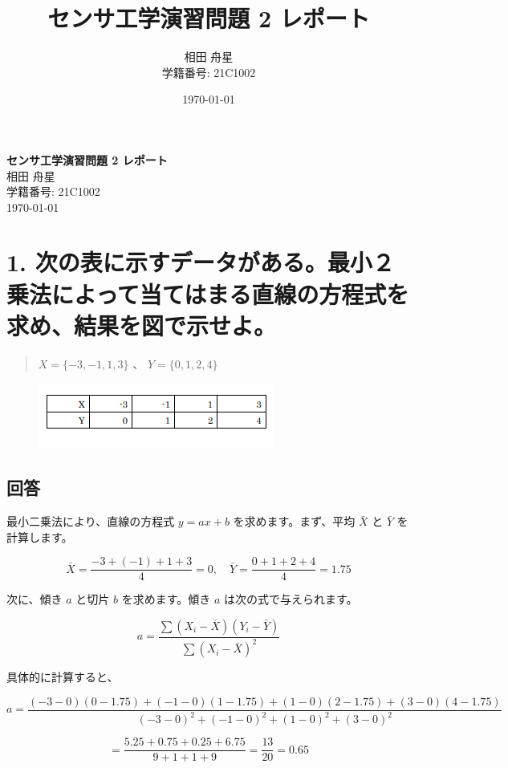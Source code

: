 \documentclass{article}
\title{センサ工学演習問題 2 レポート}
\author{相田 舟星\\学籍番号: 21C1002}
\date{\today}
\begin{document}
\begin{titlepage}
    \centering
    \vspace*{\fill}
    {\huge \textbf{センサ工学演習問題 2 レポート}}\\[1.5cm]
    {\Large 相田 舟星}\\
    {\Large 学籍番号: 21C1002}\\[2cm]
    {\large \today}
    \vspace*{\fill}
\end{titlepage}

\newpage

\section*{1. 次の表に示すデータがある。最小２乗法によって当てはまる直線の方程式を求め、結果を図で示せよ。}
\begin{quote}
    \(X = \{-3, -1, 1, 3\}\) 、 \(Y = \{0, 1, 2, 4\}\)
\end{quote}
\begin{figure}[H]
    \centering
    \includegraphics[width=0.7\linewidth]{1.png}
\end{figure}

\subsection*{回答}
最小二乗法により、直線の方程式 \(y = ax + b\) を求めます。まず、平均 \(\bar{X}\) と \(\bar{Y}\) を計算します。

\[
\bar{X} = \frac{-3 + (-1) + 1 + 3}{4} = 0, \quad \bar{Y} = \frac{0 + 1 + 2 + 4}{4} = 1.75
\]

次に、傾き \(a\) と切片 \(b\) を求めます。傾き \(a\) は次の式で与えられます。

\[
a = \frac{\sum (X_i - \bar{X})(Y_i - \bar{Y})}{\sum (X_i - \bar{X})^2}
\]

具体的に計算すると、

\[
a = \frac{(-3 - 0)(0 - 1.75) + (-1 - 0)(1 - 1.75) + (1 - 0)(2 - 1.75) + (3 - 0)(4 - 1.75)}{(-3 - 0)^2 + (-1 - 0)^2 + (1 - 0)^2 + (3 - 0)^2}
\]

\[
= \frac{5.25 + 0.75 + 0.25 + 6.75}{9 + 1 + 1 + 9} = \frac{13}{20} = 0.65
\]
\end{document}
